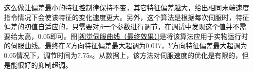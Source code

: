 \documentclass[fontset=fandol,type=bachelor,campus=harbin,bsmainpagenumberline=true]{hithesisbook}
\begin{document}
这么做让偏差最小的特征控制律保持不变，其它特征偏差越大，给出相同末端速度指令情况下会使该特征的变化速度更大。另外，这个算法是根据每次伺服时，特征偏差的初值自适应的，只需要对$\beta$一个参数进行调节，在调试中发现这个值并不需要给太高，0.05即可。图\ref{视觉伺服曲线（最终效果）}是将该算法应用于实物运行时的伺服曲线。最终在$X$方向特征偏差最大超调为0.017，$Y$方向特征偏差最大超调为0.05情况下，调节时间为7.75s。从数据上，该方法对伺服速度的优化是有限的，但是能很好的抑制超调。
\begin{figure}[h]
	\centering
\end{figure}
\end{document}
